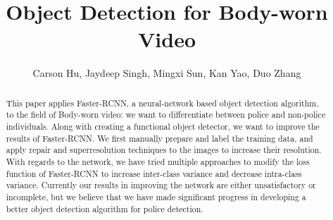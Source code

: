 \documentclass[a4paper]{article}
\title{Object Detection for Body-worn Video}
\author{Carson Hu, Jaydeep Singh, Mingxi Sun, Kan Yao, Duo Zhang}
\begin{document}
\maketitle
\nocite{*}


\begin{abstract}
This paper applies Faster-RCNN, a neural-network based object detection algorithm, to the field of Body-worn video: we want to differentiate between police and non-police individuals. Along with creating a functional object detector, we want to improve the results of Faster-RCNN. We first manually prepare and label the training data, and apply repair and superresolution techniques to the images to increase their resolution. With regards to the network, we have tried multiple approaches to modify the loss function of Faster-RCNN to increase inter-class variance and decrease intra-class variance. Currently our results in improving the network are either unsatisfactory or incomplete, but we believe that we have made significant progress in developing a better object detection algorithm for police detection.
\end{abstract}
\end{document}
